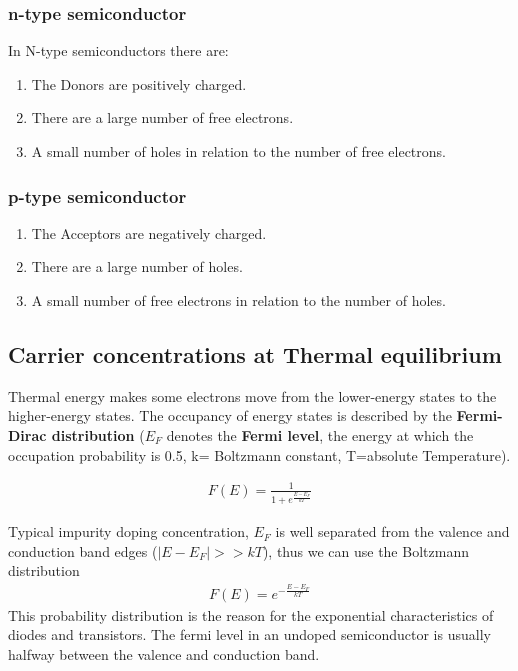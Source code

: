 \documentclass[main]{subfiles}
\begin{document}
\subsubsection{n-type semiconductor}
In N-type semiconductors there are:

\begin{enumerate}
\item The Donors are positively charged.
\item There are a large number of free electrons.
\item A small number of holes in relation to the number of free electrons.
\end{enumerate}

\subsubsection{p-type semiconductor}
\begin{enumerate}
\item The Acceptors are negatively charged.
\item There are a large number of holes.
\item A small number of free electrons in relation to the number of holes.
\end{enumerate}

\subsection{Carrier concentrations at Thermal equilibrium}
Thermal energy makes some electrons move from the lower-energy states to the higher-energy states. The occupancy of energy states is described by the \textbf{Fermi-Dirac distribution} (\(E_F\) denotes the \textbf{Fermi level}, the energy at which the occupation probability is 0.5, k= Boltzmann constant, T=absolute Temperature).

\begin{align*}
F(E) = \frac{1}{1+e^{\frac{E-E_F}{kT}}}
\end{align*}

Typical impurity doping concentration, \(E_F\) is well separated from the valence and conduction band edges (\(|E-E_F| >> kT\)), thus we can use the Boltzmann distribution
\begin{align*}
F(E) = e^{-\frac{E-E_F}{kT}}
\end{align*}
This probability distribution is the reason for the exponential characteristics of diodes and transistors. The fermi level in an undoped semiconductor is usually halfway between the valence and conduction band.
\end{document}
